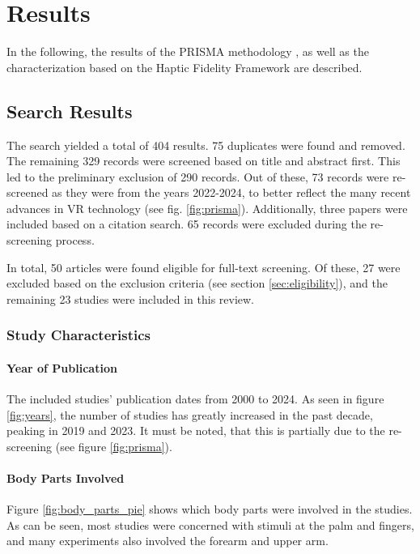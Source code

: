 \section{Results}
\label{sec:results}

In the following, the results of the PRISMA methodology \cite{Page2021TheReviews}, as well as the characterization based on the Haptic Fidelity Framework \cite{Muender2022HapticReality} are described.


\subsection{Search Results}

The search yielded a total of 404 results. 75 duplicates were found and removed. The remaining 329 records were screened based on title and abstract first. This led to the preliminary exclusion of 290 records. Out of these, 73 records were re-screened as they were from the years 2022-2024, to better reflect the many recent advances in VR technology (see fig. \ref{fig:prisma}). 
Additionally, three papers were included based on a citation search. 65 records were excluded during the re-screening process.

In total, 50 articles were found eligible for full-text screening. Of these, 27 were excluded based on the exclusion criteria (see section \ref{sec:eligibility}), and the remaining 23 studies were included in this review.


\subsubsection{Study Characteristics}
\paragraph{Year of Publication}
The included studies' publication dates from 2000 to 2024. As seen in figure \ref{fig:years}, the number of studies has greatly increased in the past decade, peaking in 2019 and 2023. It must be noted, that this is partially due to the re-screening (see figure \ref{fig:prisma}). 

\paragraph{Body Parts Involved}
Figure \ref{fig:body_parts_pie} shows which body parts were involved in the studies. As can be seen, most studies were concerned with stimuli at the palm and fingers, and many experiments also involved the forearm and upper arm.

